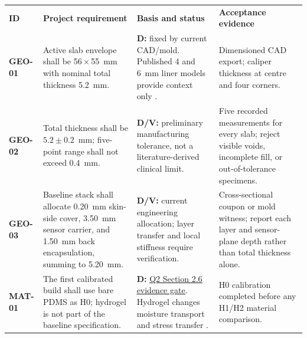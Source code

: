 \vspace{0.55em}
\begingroup
\fontsize{8.4}{9.85}\selectfont
\setlength{\tabcolsep}{3pt}
\renewcommand{\arraystretch}{1.12}
\begin{tabularx}{\linewidth}{>{\raggedright\arraybackslash\bfseries\color{AUBRed}}p{1.15cm}Y Y Y}
\color{white}\textbf{ID} & \color{white}\textbf{Project requirement} &
\color{white}\textbf{Basis and status} & \color{white}\textbf{Acceptance evidence} \\
GEO-01 & Active slab envelope shall be 56\,$\times$\,55~mm with nominal total
thickness 5.2~mm. & \textbf{D:} fixed by current CAD/mold. Published 4 and
6~mm liner models provide context only \cite{q4addacherif2025}. & Dimensioned
CAD export; caliper thickness at centre and four corners. \\
GEO-02 & Total thickness shall be $5.2\pm0.2$~mm; five-point range shall not
exceed 0.4~mm. & \textbf{D/V:} preliminary manufacturing tolerance, not a
literature-derived clinical limit. & Five recorded measurements for every
slab; reject visible voids, incomplete fill, or out-of-tolerance specimens. \\
GEO-03 & Baseline stack shall allocate 0.20~mm skin-side cover, 3.50~mm sensor
carrier, and 1.50~mm back encapsulation, summing to 5.20~mm. & \textbf{D/V:}
current engineering allocation; layer transfer and local stiffness require
verification. & Cross-sectional coupon or mold witness; report each layer and
sensor-plane depth rather than total thickness alone. \\
MAT-01 & The first calibrated build shall use bare PDMS as H0; hydrogel is not
part of the baseline specification. & \textbf{D:}
\hyperlink{q2-hydrogel-study}{\textcolor{AUBRed}{\underline{Q2 Section 2.6 evidence gate}}}. Hydrogel
changes moisture transport and stress transfer \cite{yuk2016,lu2025}. & H0
calibration completed before any H1/H2 material comparison. \\
\end{tabularx}
\endgroup
{}

\clearpage
\hypertarget{q4-implementation-geometry}{}


